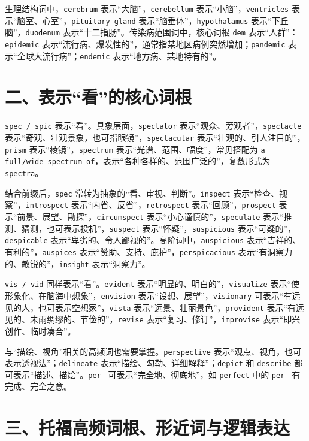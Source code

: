 \documentclass[UTF8,zihao=-4]{ctexart}
\begin{document}
生理结构词中，\texttt{cerebrum} 表示“大脑”，\texttt{cerebellum} 表示“小脑”，\texttt{ventricles} 表示“脑室、心室”，\texttt{pituitary gland} 表示“脑垂体”，\texttt{hypothalamus} 表示“下丘脑”，\texttt{duodenum} 表示“十二指肠”。传染病范围词中，核心词根 \texttt{dem} 表示“人群”：\texttt{epidemic} 表示“流行病、爆发性的”，通常指某地区病例突然增加；\texttt{pandemic} 表示“全球大流行病”；\texttt{endemic} 表示“地方病、某地特有的”。

\section*{二、表示“看”的核心词根}

\texttt{spec / spic} 表示“看”。具象层面，\texttt{spectator} 表示“观众、旁观者”，\texttt{spectacle} 表示“奇观、壮观景象，也可指眼镜”，\texttt{spectacular} 表示“壮观的、引人注目的”，\texttt{prism} 表示“棱镜”，\texttt{spectrum} 表示“光谱、范围、幅度”，常见搭配为 \texttt{a full/wide spectrum of}，表示“各种各样的、范围广泛的”，复数形式为 \texttt{spectra}。

结合前缀后，\texttt{spec} 常转为抽象的“看、审视、判断”。\texttt{inspect} 表示“检查、视察”，\texttt{introspect} 表示“内省、反省”，\texttt{retrospect} 表示“回顾”，\texttt{prospect} 表示“前景、展望、勘探”，\texttt{circumspect} 表示“小心谨慎的”，\texttt{speculate} 表示“推测、猜测，也可表示投机”，\texttt{suspect} 表示“怀疑”，\texttt{suspicious} 表示“可疑的”，\texttt{despicable} 表示“卑劣的、令人鄙视的”。高阶词中，\texttt{auspicious} 表示“吉祥的、有利的”，\texttt{auspices} 表示“赞助、支持、庇护”，\texttt{perspicacious} 表示“有洞察力的、敏锐的”，\texttt{insight} 表示“洞察力”。

\texttt{vis / vid} 同样表示“看”。\texttt{evident} 表示“明显的、明白的”，\texttt{visualize} 表示“使形象化、在脑海中想象”，\texttt{envision} 表示“设想、展望”，\texttt{visionary} 可表示“有远见的人，也可表示空想家”，\texttt{vista} 表示“远景、壮丽景色”，\texttt{provident} 表示“有远见的、未雨绸缪的、节俭的”，\texttt{revise} 表示“复习、修订”，\texttt{improvise} 表示“即兴创作、临时凑合”。

与“描绘、视角”相关的高频词也需要掌握。\texttt{perspective} 表示“观点、视角，也可表示透视法”；\texttt{delineate} 表示“描绘、勾勒、详细解释”；\texttt{depict} 和 \texttt{describe} 都可表示“描述、描绘”。\texttt{per-} 可表示“完全地、彻底地”，如 \texttt{perfect} 中的 \texttt{per-} 有完成、完全之意。

\section*{三、托福高频词根、形近词与逻辑表达}
\end{document}
